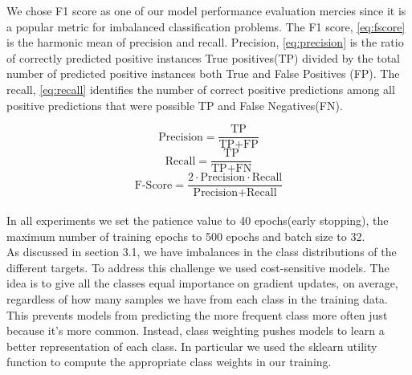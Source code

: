 \documentclass[11pt,oneside,a4paper,openright]{book}
\begin{document}

We chose F1 score as one of our model performance evaluation mercies since it is a popular metric for imbalanced classification problems. The F1 score, \autoref{eq:fscore} is the harmonic mean of precision and recall. Precision, \autoref{eq:precision} is the ratio of correctly predicted positive instances True positives(TP) divided by the total number of predicted positive instances both True and False Positives (FP). The recall, \autoref{eq:recall} identifies the number of correct positive predictions among all positive predictions that were possible TP and False Negatives(FN).


\begin{equation}\label{eq:precision}
    \text{Precision} = \frac{\text{TP}}{\text{TP} + \text{FP}}
\end{equation}
\begin{equation}\label{eq:recall}
    \text{Recall} = \frac{\text{TP}}{\text{TP} + \text{FN}}
\end{equation}
\begin{equation}\label{eq:fscore}
    \text{F-Score}=  \frac{2 \cdot \text{Precision} \cdot \text{Recall}}{\text{Precision} + \text{Recall}}
\end{equation}\\

In all experiments we set the patience value to 40 epochs(early stopping), the maximum number of training epochs to 500 epochs and batch size to 32.\\

As discussed in section 3.1, we have imbalances in the class distributions of the different targets. To address this challenge we used cost-sensitive models. The idea is to give all the classes equal importance on gradient updates, on average, regardless of how many samples we have from each class in the training data. This prevents models from predicting the more frequent class more often just because it’s more common. Instead, class weighting pushes models to learn a better representation of each class. In particular we used the sklearn utility function to compute the appropriate class weights in our training.\newpage
\end{document}
